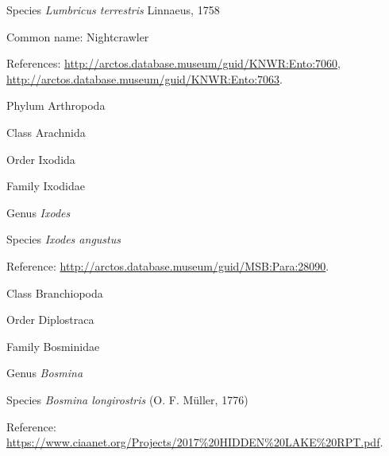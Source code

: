 \documentclass[9pt, article]{memoir}
\begin{document}
\begin{multicols}{2}
\vspace{6pt}\noindent\hspace{36pt}Species \textit{Lumbricus terrestris} Linnaeus, 1758


Common name: Nightcrawler

References: 
\url{http://arctos.database.museum/guid/KNWR:Ento:7060}, 
\url{http://arctos.database.museum/guid/KNWR:Ento:7063}.

\vspace{6pt}\noindent\hspace{6pt}Phylum Arthropoda


\vspace{6pt}\noindent\hspace{12pt}Class Arachnida


\vspace{6pt}\noindent\hspace{18pt}Order Ixodida


\vspace{6pt}\noindent\hspace{24pt}Family Ixodidae


\vspace{6pt}\noindent\hspace{30pt}Genus \textit{Ixodes}


\vspace{6pt}\noindent\hspace{36pt}Species \textit{Ixodes angustus}


Reference: 
\url{http://arctos.database.museum/guid/MSB:Para:28090}.

\vspace{6pt}\noindent\hspace{12pt}Class Branchiopoda


\vspace{6pt}\noindent\hspace{18pt}Order Diplostraca


\vspace{6pt}\noindent\hspace{24pt}Family Bosminidae


\vspace{6pt}\noindent\hspace{30pt}Genus \textit{Bosmina}


\vspace{6pt}\noindent\hspace{36pt}Species \textit{Bosmina longirostris} (O. F. Müller, 1776)


Reference: 
\url{https://www.ciaanet.org/Projects/2017%20HIDDEN%20LAKE%20RPT.pdf}.


\end{multicols}
\end{document}
